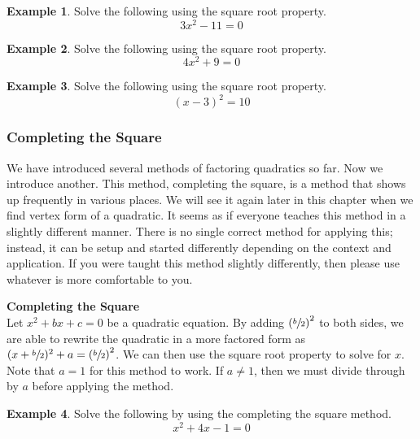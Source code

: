 \documentclass[addpoints,12pt]{exam}
\theoremstyle{definition}
\theoremstyle{break}
\theoremstyle{break}
\newtheorem{example}{Example}[subsection]
\begin{document}
\begin{example}
Solve the following using the square root property.
\[ 3x^2-11=0\]
\vspace{1.5in}
\end{example}

\begin{example}
Solve the following using the square root property.
\[ 4x^2 +9 = 0\]
\vspace{1.5in}
\end{example}

\begin{example}
Solve the following using the square root property.
\[ (x-3)^2 = 10\]
\vspace{1.5in}
\end{example}

\newpage

\subsubsection*{Completing the Square}

We have introduced several methods of factoring quadratics so far. Now we introduce another. This method, completing the square, is a method that shows up frequently in various places. We will see it again later in this chapter when we find vertex form of a quadratic. It seems as if everyone teaches this method in a slightly different manner. There is no single correct method for applying this; instead, it can be setup and started differently depending on the context and application. If you were taught this method slightly differently, then please use whatever is more comfortable to you.

\vspace{.2in}

\begin{mdframed}
\textbf{Completing the Square}\mbox{}\\
Let $x^2 + bx + c = 0$ be a quadratic equation. By adding $\left(\sfrac{b}{2}\right)^2$ to both sides, we are able to rewrite the quadratic in a more factored form as $(x+\sfrac{b}{2})^2 +a = \left(\sfrac{b}{2}\right)^2$. We can then use the square root property to solve for $x$. Note that $a=1$ for this method to work. If $a\neq 1$, then we must divide through by $a$ before applying the method.
\end{mdframed}

\vspace{.2in}

\begin{example}
Solve the following by using the completing the square method.
\[ x^2 + 4x - 1 = 0\]

\vspace{2in}
\end{example}
\end{document}
